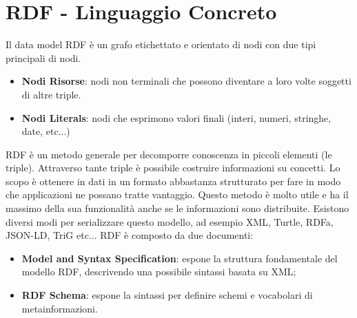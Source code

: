 \section{RDF - Linguaggio Concreto}
Il data model RDF è un grafo etichettato e orientato di nodi con due tipi principali di nodi.
\begin{itemize}
	\item \textbf{Nodi Risorse}: nodi non terminali che possono diventare a loro volte soggetti di altre triple.
	\item \textbf{Nodi Literals}: nodi che esprimono valori finali (interi, numeri, stringhe, date, etc...)
\end{itemize}
RDF è un metodo generale per decomporre conoscenza in piccoli elementi (le triple). Attraverso tante triple è possibile costruire informazioni su concetti. Lo scopo è ottenere in dati in un formato abbastanza strutturato per fare in modo che applicazioni ne possano tratte vantaggio. Questo metodo è molto utile e ha il massimo della sua funzionalità anche se le informazioni sono distribuite.\newline\newline
Esistono diversi modi per serializzare questo modello, ad esempio XML, Turtle, RDFa, JSON-LD, TriG etc...\newline
RDF è composto da due documenti:
\begin{itemize}
	\item \textbf{Model and Syntax Specification}: espone la struttura fondamentale del modello RDF, descrivendo una possibile sintassi basata su XML;
	\item \textbf{RDF Schema}: espone la sintassi per definire schemi e vocabolari di metainformazioni.
\end{itemize}
